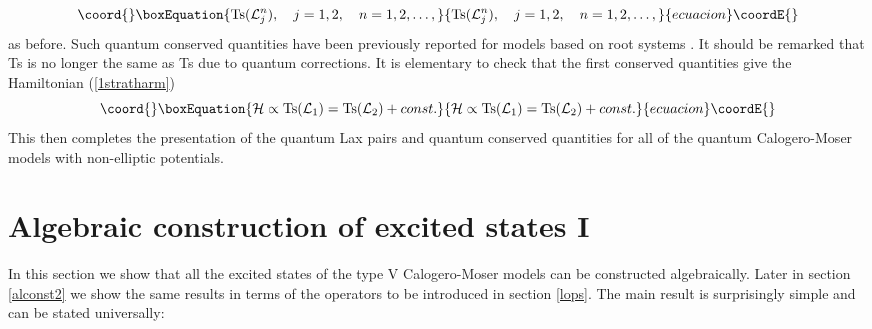 \documentclass[a4paper,12pt]{article}
\begin{document}
\begin{equation}\coord{}\boxEquation{
   \mbox{Ts}({\cal L}_j^n),\quad j=1,2,\quad n=1,2,\ldots,
}{
   \mbox{Ts}({\cal L}_j^n),\quad j=1,2,\quad n=1,2,\ldots,
}{ecuacion}\coordE{}\end{equation}
as before.
Such quantum conserved quantities have been previously reported for
models based on \coordHE{} root systems \cite{ShasSuth,UjWa}.
It should be remarked that {Ts}\coordHE{} is no longer the same as
{Ts}\coordHE{} due to quantum corrections.
It is elementary to check that the first conserved quantities
give the Hamiltonian (\ref{1stratharm})
\begin{equation}\coord{}\boxEquation{
  {\cal H} \propto\mbox{Ts}({\cal L}_1)= \mbox{Ts}({\cal
   L}_2) +const.
}{
  {\cal H} \propto\mbox{Ts}({\cal L}_1)= \mbox{Ts}({\cal
   L}_2) +const.
}{ecuacion}\coordE{}\end{equation}
This then completes the presentation of the quantum Lax pairs
and quantum conserved quantities for all of
the quantum Calogero-Moser models with non-elliptic potentials.


\section{Algebraic construction of excited states I}
\label{alconst1}
\setcounter{equation}{0}
In this section we show that all the excited states of the
type V Calogero-Moser
models
can be constructed algebraically.
Later in section \ref{alconst2} we show the same results in terms of
the \myHighlight{\(\ell\)}\coordHE{} operators to be introduced in section \ref{lops}.
The main result is surprisingly simple and can be stated universally:
\end{document}
